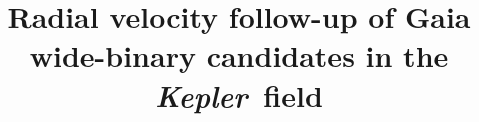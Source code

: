 %
%
%
%


\newcommand{\Kepler}{{\it Kepler}}
\newcommand{\kepler}{{\it Kepler}}
\newcommand{\gaia}{{\it Gaia}}
\newcommand{\Gaia}{{\it Gaia}}
\newcommand{\TGAS}{{\it TGAS}}
\newcommand{\tgas}{{\it TGAS}}
\newcommand{\apj}{ApJ}
\newcommand{\apjl}{ApJ Letters}
\newcommand{\mnras}{MNRAS}
\newcommand{\nat}{Nature}
\newcommand{\etal}{{\it et al.}}
\newcommand{\eg}{{\it e.g.}}



%
%

\title{Radial velocity follow-up of Gaia wide-binary candidates in the
\Kepler\ field}

%
%
%

\begin{PI}
\end{PI}

\begin{CoI}
\end{CoI}


